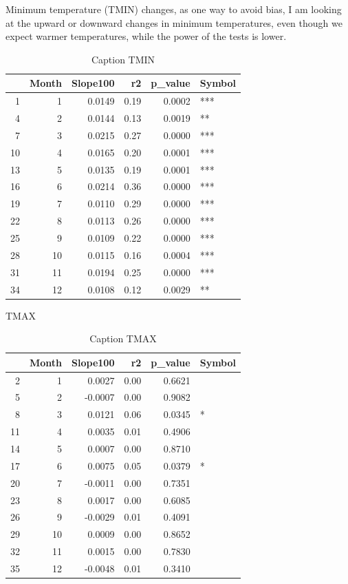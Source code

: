 \documentclass{article}\usepackage[]{graphicx}\usepackage[]{color}
\begin{document}
Minimum temperature (TMIN) changes, as one way to avoid bias, I am looking at the upward or downward changes in minimum temperatures, even though we expect warmer temperatures, while the power of the tests is lower.  
\begin{table}[ht]
\centering
\begin{tabular}{rrrrrl}
  \hline
 & Month & Slope100 & r2 & p\_value & Symbol \\ 
  \hline
1 & 1 & 0.0149 & 0.19 & 0.0002 & *** \\ 
  4 & 2 & 0.0144 & 0.13 & 0.0019 & ** \\ 
  7 & 3 & 0.0215 & 0.27 & 0.0000 & *** \\ 
  10 & 4 & 0.0165 & 0.20 & 0.0001 & *** \\ 
  13 & 5 & 0.0135 & 0.19 & 0.0001 & *** \\ 
  16 & 6 & 0.0214 & 0.36 & 0.0000 & *** \\ 
  19 & 7 & 0.0110 & 0.29 & 0.0000 & *** \\ 
  22 & 8 & 0.0113 & 0.26 & 0.0000 & *** \\ 
  25 & 9 & 0.0109 & 0.22 & 0.0000 & *** \\ 
  28 & 10 & 0.0115 & 0.16 & 0.0004 & *** \\ 
  31 & 11 & 0.0194 & 0.25 & 0.0000 & *** \\ 
  34 & 12 & 0.0108 & 0.12 & 0.0029 & ** \\ 
   \hline
\end{tabular}
\caption{Caption TMIN} 
\end{table}


TMAX
\begin{table}[ht]
\centering
\begin{tabular}{rrrrrl}
  \hline
 & Month & Slope100 & r2 & p\_value & Symbol \\ 
  \hline
2 & 1 & 0.0027 & 0.00 & 0.6621 &  \\ 
  5 & 2 & -0.0007 & 0.00 & 0.9082 &  \\ 
  8 & 3 & 0.0121 & 0.06 & 0.0345 & * \\ 
  11 & 4 & 0.0035 & 0.01 & 0.4906 &  \\ 
  14 & 5 & 0.0007 & 0.00 & 0.8710 &  \\ 
  17 & 6 & 0.0075 & 0.05 & 0.0379 & * \\ 
  20 & 7 & -0.0011 & 0.00 & 0.7351 &  \\ 
  23 & 8 & 0.0017 & 0.00 & 0.6085 &  \\ 
  26 & 9 & -0.0029 & 0.01 & 0.4091 &  \\ 
  29 & 10 & 0.0009 & 0.00 & 0.8652 &  \\ 
  32 & 11 & 0.0015 & 0.00 & 0.7830 &  \\ 
  35 & 12 & -0.0048 & 0.01 & 0.3410 &  \\ 
   \hline
\end{tabular}
\caption{Caption TMAX} 
\end{table}
\end{document}
